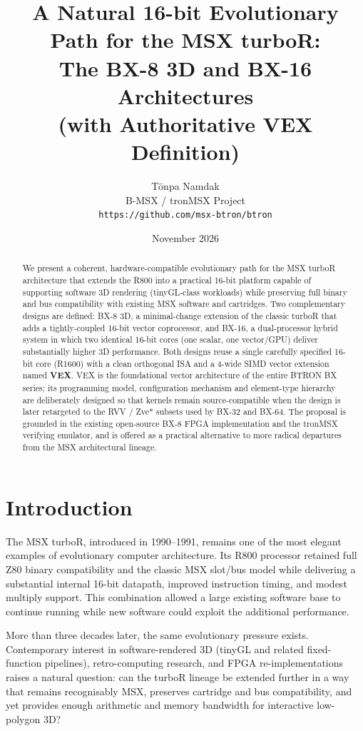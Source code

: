 \documentclass[11pt,a4paper]{article}
\title{
A Natural 16-bit Evolutionary Path for the MSX turboR:\\
The BX-8 3D and BX-16 Architectures\\
(with Authoritative VEX Definition)
}
\author{
T\"onpa Namdak\\
B-MSX / tronMSX Project\\
\texttt{https://github.com/msx-btron/btron}
}
\date{November 2026}
\begin{document}
\maketitle

\begin{abstract}
We present a coherent, hardware-compatible evolutionary path for the MSX turboR architecture that extends the R800 into a practical 16-bit platform capable of supporting software 3D rendering (tinyGL-class workloads) while preserving full binary and bus compatibility with existing MSX software and cartridges. Two complementary designs are defined: BX-8 3D, a minimal-change extension of the classic turboR that adds a tightly-coupled 16-bit vector coprocessor, and BX-16, a dual-processor hybrid system in which two identical 16-bit cores (one scalar, one vector/GPU) deliver substantially higher 3D performance. Both designs reuse a single carefully specified 16-bit core (R1600) with a clean orthogonal ISA and a 4-wide SIMD vector extension named \textbf{VEX}. VEX is the foundational vector architecture of the entire BTRON BX series; its programming model, configuration mechanism and element-type hierarchy are deliberately designed so that kernels remain source-compatible when the design is later retargeted to the RVV / Zve* subsets used by BX-32 and BX-64. The proposal is grounded in the existing open-source BX-8 FPGA implementation and the tronMSX verifying emulator, and is offered as a practical alternative to more radical departures from the MSX architectural lineage.
\end{abstract}

\tableofcontents
\newpage

\section{Introduction}

The MSX turboR, introduced in 1990--1991, remains one of the most elegant examples of evolutionary computer architecture. Its R800 processor retained full Z80 binary compatibility and the classic MSX slot/bus model while delivering a substantial internal 16-bit datapath, improved instruction timing, and modest multiply support. This combination allowed a large existing software base to continue running while new software could exploit the additional performance.

More than three decades later, the same evolutionary pressure exists. Contemporary interest in software-rendered 3D (tinyGL and related fixed-function pipelines), retro-computing research, and FPGA re-implementations raises a natural question: can the turboR lineage be extended further in a way that remains recognisably MSX, preserves cartridge and bus compatibility, and yet provides enough arithmetic and memory bandwidth for interactive low-polygon 3D?
\end{document}
